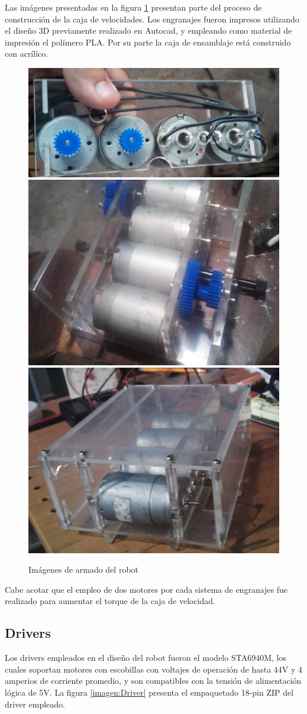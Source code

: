 Las imágenes presentadas en la figura \ref{imagen:construccionFinalRobot} presentan parte del proceso de construcción de la caja de velocidades. Los engranajes fueron impresos utilizando el diseño 3D previamente realizado en Autocad, y empleando como material de impresión el polímero PLA.  Por su parte la caja de ensamblaje está construido con acrílico.


\begin{figure}[H]
	\centering		\includegraphics[width=0.7\linewidth]{imagenes/prototipo/Motores}
	\includegraphics[width=0.4\linewidth]{imagenes/prototipo/CajaColocandoEngranejes}
	\includegraphics[width=0.4\linewidth]{imagenes/prototipo/CajaLista}

	\caption[Imágenes de partes del robot]{Imágenes de armado del robot}
	\label{imagen:construccionFinalRobot}
\end{figure}

Cabe acotar que el empleo de dos motores por cada sistema de engranajes fue realizado para aumentar el torque de la caja de velocidad.

\subsection{Drivers}

Los drivers empleados en el diseño del robot fueron el modelo STA6940M, los cuales soportan motores con escobillas con voltajes de operación de hasta 44V y 4 amperios de corriente promedio, y son compatibles con la tensión de alimentación lógica de 5V. La figura \ref{imagen:Driver} presenta el empaquetado 18-pin ZIP del driver empleado.

